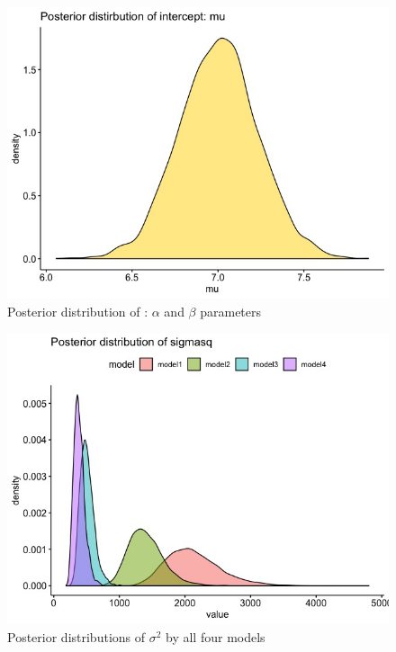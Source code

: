 \documentclass[11pt,twocolumn]{asaproc}
\begin{document}
\begin{figure}[t]
\centering\includegraphics[scale=.30]{interceptM1.jpeg}
\caption{Posterior distribution of : $\alpha$ and $\beta$ parameters}
\label{fig:intercept}
\end{figure}

\begin{figure}[t]
\centering\includegraphics[scale=.30]{sigmasq.jpeg}
\caption{Posterior distributions of $\sigma^2$ by all four models}
\label{fig:sigmas}
\end{figure}
\end{document}
